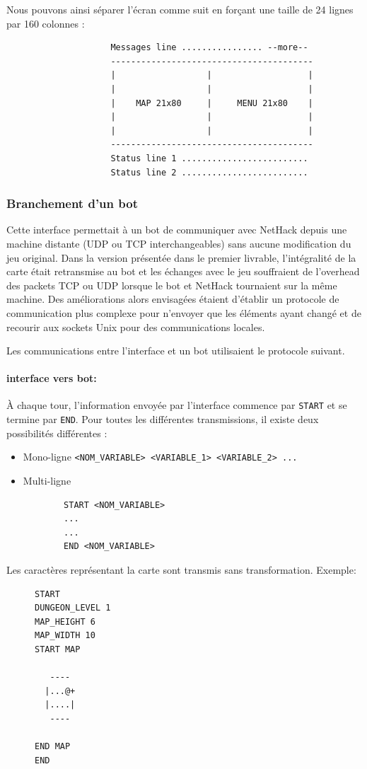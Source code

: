 \documentclass[a4paper,12pt]{article}
\begin{document}
Nous pouvons ainsi séparer l'écran comme suit en forçant une taille de 24
lignes par 160 colonnes :

\begin{figure}[H]
\begin{verbatim}
               Messages line ................ --more--
               ----------------------------------------
               |                  |                   |
               |                  |                   |
               |    MAP 21x80     |     MENU 21x80    |
               |                  |                   |
               |                  |                   |
               ----------------------------------------
               Status line 1 .........................
               Status line 2 .........................
\end{verbatim}
\end{figure}

\subsubsection*{Branchement d'un bot}

Cette interface permettait à un bot de communiquer avec NetHack depuis une
machine distante (UDP ou TCP interchangeables) sans aucune modification du jeu
original. Dans la version présentée dans le premier livrable, l'intégralité de
la carte était retransmise au bot et les échanges avec le jeu souffraient de
l'overhead des packets TCP ou UDP lorsque le bot et NetHack tournaient sur la
même machine. Des améliorations alors envisagées étaient d'établir un
protocole de communication plus complexe pour n'envoyer que les éléments ayant
changé et de recourir aux sockets Unix pour des communications locales.

Les communications entre l'interface et un bot utilisaient le protocole
suivant.

\paragraph{interface vers bot:} À chaque tour, l'information envoyée par
l'interface commence par \verb!START! et se termine par \verb!END!. Pour
toutes les différentes transmissions, il existe deux possibilités différentes
:
\begin{itemize}
	\item Mono-ligne \verb!<NOM_VARIABLE> <VARIABLE_1> <VARIABLE_2> ...!
	\item Multi-ligne
		\begin{verbatim}
		START <NOM_VARIABLE>
		...
		...
		END <NOM_VARIABLE>
		\end{verbatim}
\end{itemize}
Les caractères représentant la carte sont transmis sans transformation. Exemple:
\begin{figure}[H]
\begin{verbatim}
START
DUNGEON_LEVEL 1
MAP_HEIGHT 6
MAP_WIDTH 10
START MAP
          
   ----   
  |...@+  
  |....|  
   ----   
          
END MAP
END
\end{verbatim}
\end{figure}
\end{document}
